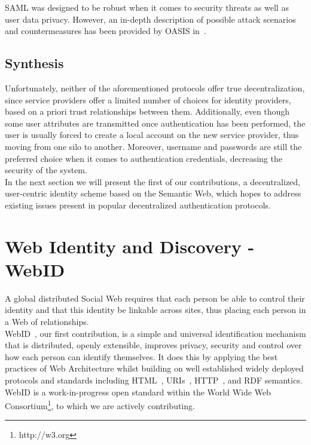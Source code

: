 SAML was designed to be robust when it comes to security threats as well as user data privacy. However, an in-depth description of possible attack scenarios and countermeasures has been provided by OASIS in~\cite{maler2005security}.\\


\subsection{Synthesis}
Unfortunately, neither of the aforementioned protocols offer true decentralization, since service providers offer a limited number of choices for identity providers, based on a priori trust relationships between them. Additionally, even though some user attributes are transmitted once authentication has been performed, the user is usually forced to create a local account on the new service provider, thus moving from one silo to another. Moreover, username and passwords are still the preferred choice when it comes to authentication credentials, decreasing the security of the system.\\

In the next section we will present the first of our contributions, a decentralized, user-centric identity scheme based on the Semantic Web, which hopes to address existing issues present in popular decentralized authentication protocols.


\section{Web Identity and Discovery - WebID}
\label{sec:webid}
A global distributed Social Web requires that each person be able to control their identity and that this identity be linkable across sites, thus placing each person in a Web of relationships.\\

WebID~\cite{webid2013}, our first contribution, is a simple and universal identification mechanism that is distributed, openly extensible, improves privacy, security and control over how each person can identify themselves. It does this by applying the best practices of Web Architecture whilst building on well established widely deployed protocols and standards including HTML~\cite{berners1995hypertext}, URIs~\cite{berners1998uniform}, HTTP~\cite{berners1996hypertext}, and RDF semantics. WebID is a work-in-progress open standard within the World Wide Web Consortium\footnote{http://w3.org}, to which we are actively contributing.\\

